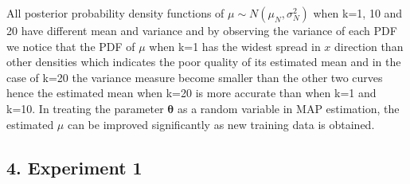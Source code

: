 \documentclass[a4paper]{article}
\begin{document}
All posterior probability density functions of $\mu \sim N(\mu_{N}, \sigma^{2}_{N})$ when k=1, 10 and 20 have different mean and variance and by observing the variance of each PDF we notice that the PDF of $\mu$ when k=1 has the widest spread in $x$ direction than other densities which indicates the poor quality of its estimated mean and in the case of k=20 the variance measure become smaller than the other two curves hence the estimated mean when k=20 is more accurate than when k=1 and k=10. In treating the parameter $\boldsymbol{\theta}$ as a random variable in MAP estimation, the estimated $\mu$ can be improved significantly as new training data is obtained.

\subsection*{4. Experiment 1}

\end{document}
